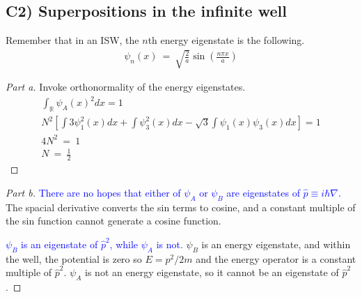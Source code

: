 \documentclass{article}
\numberwithin{equation}{section}
\newcommand{\RR}{\mathbb{R}}
\begin{document}
\subsection*{C2) Superpositions in the infinite well}

Remember that in an ISW, the $n$th energy eigenstate is the following. 
\begin{align}
    \psi_n(x) \ = \ \sqrt{\frac 2 a} \sin\left(\frac {n \pi x} a\right)
\end{align}

\begin{proof}
    [Part a]
    Invoke orthonormality of the energy eigenstates. 
    \begin{align}
        \int_\RR \psi_A(x)^2 dx = 1 \\ 
        N^2 \left[
            \int 3 \psi_1^2(x) dx + \int \psi_3^2(x) dx - \sqrt 3 
            \int \psi_1(x)\psi_3(x) dx 
        \right] = 1 \\ 
        4N^2 \ = \ 1 \\ 
        \boxed{
        N\ = \ \frac 1 2}
    \end{align}
\end{proof}

\begin{proof}
    [Part b]\textcolor{blue}{
    There are no hopes that either of $\psi_A$ or $\psi_B$ 
    are eigenstates of $\hat p\equiv i\hbar \nabla$.} The spacial 
    derivative converts the sin terms to cosine, and a constant 
    multiple of the sin function cannot generate a cosine function. 
    
    \textcolor{blue}{$\psi_B$ is an eigenstate of $\hat p^2$, while $\psi_A$ is not. }
    $\psi_B$ is an energy eigenstate, and within the well, 
    the potential is zero so $E = p^2/2m$ and the energy operator 
    is a constant multiple of $\hat p^2$. $\psi_A$ is not an 
    energy eigenstate, so it cannot be an eigenstate of $\hat p^2$. 
\end{proof}
\end{document}
